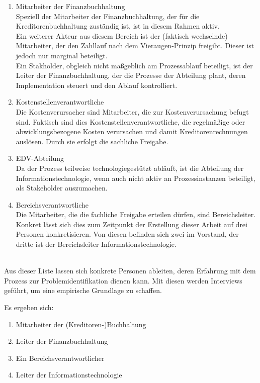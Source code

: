 \begin{enumerate}
\item{Mitarbeiter der Finanzbuchhaltung}
\\ Speziell der Mitarbeiter der Finanzbuchhaltung, der für die Kreditorenbuchhaltung zuständig ist, ist in diesem Rahmen aktiv. 
\\ Ein weiterer Akteur aus diesem Bereich ist der (faktisch wechselnde) Mitarbeiter, der den Zahllauf nach dem Vieraugen-Prinzip freigibt. 
Dieser ist jedoch nur marginal beteiligt.
\\ Ein Stakholder, obgleich nicht maßgeblich am Prozessablauf beteiligt, ist der Leiter der Finanzbuchhaltung, der die Prozesse der Abteilung plant, deren Implementation steuert und den Ablauf kontrolliert.

\item{Kostenstellenverantwortliche}
\\ Die Kostenverursacher sind Mitarbeiter, die zur Kostenverursachung befugt sind. 
Faktisch sind dies Kostenstellenverantwortliche, die regelmäßige oder abwicklungsbezogene Kosten verursachen und damit Kreditorenrechnungen auslösen. 
Durch sie erfolgt die sachliche Freigabe.

\item{EDV-Abteilung}
\\ Da der Prozess teilweise technologiegestützt abläuft, ist die Abteilung der Informationstechnologie, wenn auch nicht aktiv an Prozessinstanzen beteiligt, als Stakeholder auszumachen. 

\item{Bereichsverantwortliche}
\\ Die Mitarbeiter, die die fachliche Freigabe erteilen dürfen, sind Bereichsleiter. 
Konkret lässt sich dies zum Zeitpunkt der Erstellung dieser Arbeit auf drei Personen konkretisieren. 
Von diesen befinden sich zwei im Vorstand, der dritte ist der Bereichsleiter Informationstechnologie.

\end{enumerate}
~\ \\
Aus dieser Liste lassen sich konkrete Personen ableiten, deren Erfahrung mit dem Prozess zur Problemidentifikation dienen kann. 
Mit diesen werden Interviews geführt, um eine empirische Grundlage zu schaffen.

Es ergeben sich:

\begin{enumerate}
\item{Mitarbeiter der (Kreditoren-)Buchhaltung}
\item{Leiter der Finanzbuchhaltung}
\item{Ein Bereichsverantwortlicher}
\item{Leiter der Informationstechnologie}
\end{enumerate}

